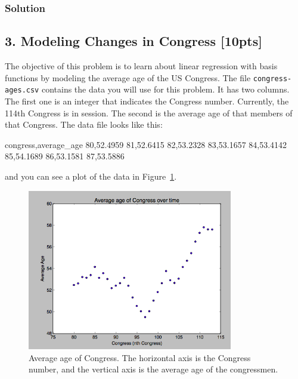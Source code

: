 \documentclass[submit]{harvardml}
\begin{document}
\subsubsection*{Solution}



























\newpage
\subsection*{3. Modeling Changes in Congress [10pts]}
 The objective of this problem is to learn about linear regression with basis
 functions by modeling the average age of the US Congress. The file
 \verb|congress-ages.csv| contains the data you will use for this problem.  It
 has two columns.  The first one is an integer that indicates the Congress
 number. Currently, the 114th Congress is in session. The second is the average
 age of that members of that Congress.  The data file looks like this:
\begin{csv}
congress,average_age
80,52.4959
81,52.6415
82,53.2328
83,53.1657
84,53.4142
85,54.1689
86,53.1581
87,53.5886
\end{csv}
and you can see a plot of the data in Figure~\ref{fig:congress}.

\begin{figure}[h]
\centering
\includegraphics[width=0.8\textwidth]{congress-ages}
\caption{Average age of Congress.  The horizontal axis is the Congress number, and the vertical axis is the average age of the congressmen.}
\label{fig:congress}
\end{figure}
\end{document}
